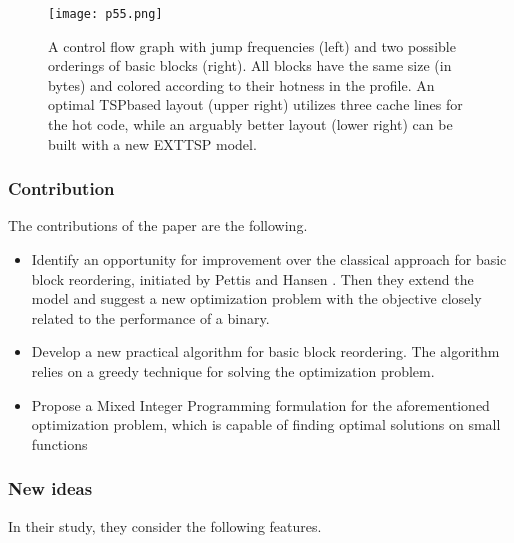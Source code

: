 \begin{figure}[H]
    \centering
     \texttt{[image: p55.png]}
         \caption{A control flow graph with jump frequencies (left) and two possible
         orderings of basic blocks (right). All blocks have the same size (in bytes)
         and colored according to their hotness in the profile. An optimal TSPbased layout (upper right) utilizes three cache lines for the hot code,
         while an arguably better layout (lower right) can be built with a new
         EXTTSP model.}
         \label{fig:p55}
\end{figure}


\subsubsection{Contribution}

The contributions of the paper are the following.

\begin{itemize}
\item  Identify an opportunity for improvement over the
classical approach for basic block reordering, initiated
by Pettis and Hansen \cite{pettis1990profile}. Then they extend the model and
suggest a new optimization problem with the objective
closely related to the performance of a binary.

\item Develop a new practical algorithm for basic
block reordering. The algorithm relies on a greedy
technique for solving the optimization problem.

\item Propose a Mixed Integer Programming formulation
for the aforementioned optimization problem, which is
capable of finding optimal solutions on small functions
\end{itemize}

\subsubsection{New ideas}

In their study, they consider the following features.

